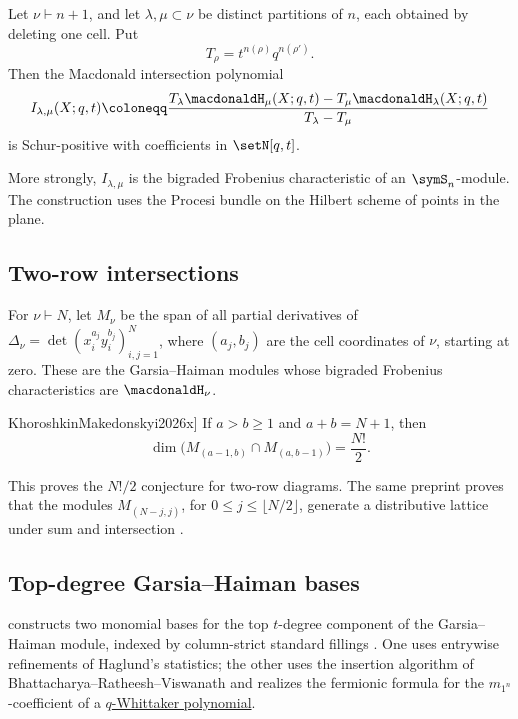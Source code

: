\begin{theorem}
Let \(\nu\vdash n+1\), and let \(\lambda,\mu\subset\nu\) be distinct
partitions of \(n\), each obtained by deleting one cell.  Put
\[
  T_\rho=t^{n(\rho)}q^{n(\rho')}.
\]
Then the Macdonald intersection polynomial
\[
  I_{\lambda,\mu}(X;q,t)
  \coloneqq
  \frac{
    T_\lambda\macdonaldH_\mu(X;q,t)
    -T_\mu\macdonaldH_\lambda(X;q,t)}
  {T_\lambda-T_\mu}
\]
is Schur-positive with coefficients in \(\setN[q,t]\).
\end{theorem}

More strongly, \(I_{\lambda,\mu}\) is the bigraded Frobenius characteristic
of an \(\symS_n\)-module.  The construction uses the Procesi bundle on the
Hilbert scheme of points in the plane.


\subsection[macdonaldHTwoRowIntersections]{Two-row intersections}

For $\nu\vdash N$, let $M_\nu$ be the span of all partial derivatives of
$\Delta_\nu=\det(x_i^{a_j}y_i^{b_j})_{i,j=1}^N$, where $(a_j,b_j)$ are
the cell coordinates of $\nu$, starting at zero. These are the
Garsia--Haiman modules whose bigraded Frobenius characteristics are
$\macdonaldH_\nu$.

\begin{theorem}[\cite[Thm.~D]{KhoroshkinMakedonskyi2026x}]
If $a>b\geq1$ and $a+b=N+1$, then
\[
 \dim\bigl(M_{(a-1,b)}\cap M_{(a,b-1)}\bigr)=\frac{N!}{2}.
\]
\end{theorem}

This proves the $N!/2$ conjecture for two-row diagrams.
The same preprint proves that the modules $M_{(N-j,j)}$, for
$0\leq j\leq\lfloor N/2\rfloor$, generate a distributive lattice under
sum and intersection \cite[Thm.~C]{KhoroshkinMakedonskyi2026x}.

\subsection[macdonaldHTopDegreeBases]{Top-degree Garsia--Haiman bases}

 constructs two monomial bases for the top $t$-degree
component of the Garsia--Haiman module, indexed by column-strict standard
fillings \cite[Thms.~3--4]{Chou2026x}. One uses entrywise refinements of
Haglund's statistics; the other uses the insertion algorithm of
Bhattacharya--Ratheesh--Viswanath and realizes the fermionic formula for the
$m_{1^n}$-coefficient of a \hyperref[qWhittaker]{$q$-Whittaker polynomial}.

